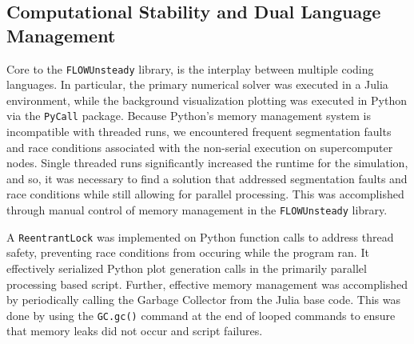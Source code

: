 \documentclass{report}
\begin{document}
\begin{appendices}
\chapter{Computational Stability and Dual Language Management}\label{app:debugging}
Core to the \texttt{FLOWUnsteady} library, is the interplay between multiple coding languages. In particular, the primary numerical solver was executed in a Julia environment, while the background visualization plotting was executed in Python via the \texttt{PyCall} package.
Because Python's memory management system is incompatible with threaded runs, we encountered frequent segmentation faults and race conditions associated with the non-serial execution on supercomputer nodes.
Single threaded runs significantly increased the runtime for the simulation, and so, it was necessary to find a solution that addressed segmentation faults and race conditions while still allowing for parallel processing.
This was accomplished through manual control of memory management in the \texttt{FLOWUnsteady} library. 

A \texttt{ReentrantLock} was implemented on Python function calls to address thread safety, preventing race conditions from occuring while the program ran. It effectively serialized Python plot generation calls in the primarily parallel processing based script.
Further, effective memory management was accomplished by periodically calling the Garbage Collector from the Julia base code. This was done by using the \texttt{GC.gc()} command at the end of looped commands to ensure that memory leaks did not occur and script failures.
\end{appendices}
\end{document}
